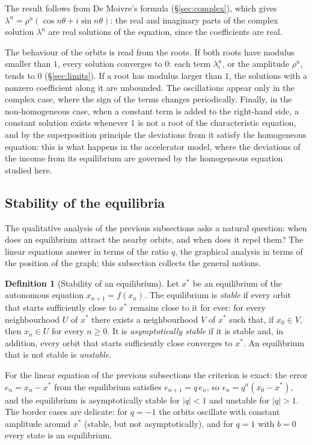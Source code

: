 \documentclass[11pt,a4paper]{article}
\theoremstyle{definition} \newtheorem{definition}{Definition} \theoremstyle{plain} \newtheorem{theorem}{Theorem}
\begin{document}
The result follows from De Moivre's formula (\S\ref{sec:complex}), which gives
$\lambda^n=\rho^n(\cos n\theta+i\sin n\theta)$: the real and imaginary
parts of the complex solution $\lambda^n$ are real solutions of the
equation, since the coefficients are real.

The behaviour of the orbits is read from the roots. If both roots have
modulus smaller than $1$, every solution converges to $0$: each term
$\lambda_i^n$, or the amplitude $\rho^n$, tends to $0$ (\S\ref{sec:limits}). If a root
has modulus larger than $1$, the solutions with a nonzero coefficient
along it are unbounded. The oscillations appear only in the complex
case, where the sign of the terms changes periodically. Finally, in the
non-homogeneous case, when a constant term is added to the right-hand
side, a constant solution exists whenever $1$ is not a root of the
characteristic equation, and by the superposition principle the
deviations from it satisfy the homogeneous equation: this is what
happens in the accelerator model, where the deviations of the income
from its equilibrium are governed by the homogeneous equation studied
here.

\subsection{Stability of the equilibria}

The qualitative analysis of the previous subsections asks a natural
question: when does an equilibrium attract the nearby orbits, and when
does it repel them? The linear equations answer in terms of the ratio
$q$, the graphical analysis in terms of the position of the graph; this
subsection collects the general notions.

\begin{definition}[Stability of an equilibrium] Let $x^*$ be an
equilibrium of the autonomous equation $x_{n+1}=f(x_n)$. The equilibrium
is \emph{stable} if every orbit that starts sufficiently close to $x^*$
remains close to it for ever: for every neighbourhood $U$ of $x^*$ there
exists a neighbourhood $V$ of $x^*$ such that, if $x_0\in V$, then
$x_n\in U$ for every $n\ge 0$. It is \emph{asymptotically stable} if it
is stable and, in addition, every orbit that starts sufficiently close
converges to $x^*$. An equilibrium that is not stable is \emph{unstable}.
\end{definition}

For the linear equation of the previous subsections the criterion is
exact: the error $e_n=x_n-x^*$ from the equilibrium satisfies
$e_{n+1}=q\,e_n$, so $e_n=q^n(x_0-x^*)$, and the equilibrium is
asymptotically stable for $|q|<1$ and unstable for $|q|>1$. The border
cases are delicate: for $q=-1$ the orbits oscillate with constant
amplitude around $x^*$ (stable, but not asymptotically), and for $q=1$
with $b=0$ every state is an equilibrium.
\end{document}
